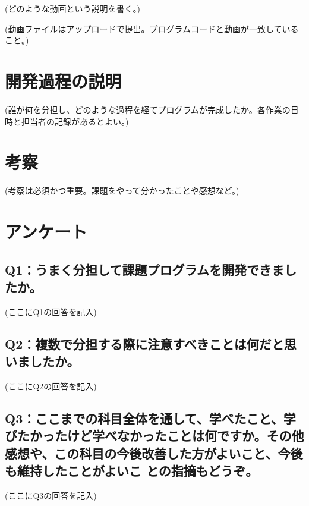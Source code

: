 \documentclass[12pt,a4j]{jarticle}
\begin{document}
(どのような動画という説明を書く。)

(動画ファイルはアップロードで提出。プログラムコードと動画が一致していること。)



\section{開発過程の説明}



(誰が何を分担し、どのような過程を経てプログラムが完成したか。各作業の日時と担当者の記録があるとよい。)



\section{考察}



(考察は必須かつ重要。課題をやって分かったことや感想など。)



\section{アンケート}



\subsection{Q1：うまく分担して課題プログラムを開発できましたか。}



(ここにQ1の回答を記入)



\subsection{Q2：複数で分担する際に注意すべきことは何だと思いましたか。}



(ここにQ2の回答を記入)



\subsection{Q3：ここまでの科目全体を通して、学べたこと、学びたかったけど学べなかったことは何ですか。その他感想や、この科目の今後改善した方がよいこと、今後も維持したことがよいこ との指摘もどうぞ。}



(ここにQ3の回答を記入)
\end{document}
